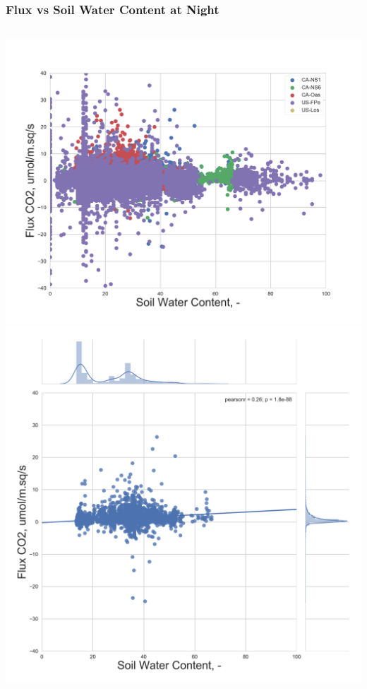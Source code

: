 \documentclass{beamer}
\begin{document}
\begin{frame}
\frametitle{Flux vs Soil Water Content at Night}

\begin{columns}[t]
\centering
\includegraphics[width=\textwidth]{FvsSWC_night/all.png}\\
\includegraphics[width=\textwidth]{FvsSWC_night/CA-NS1.png}

\end{columns}
\end{frame}
\end{document}
